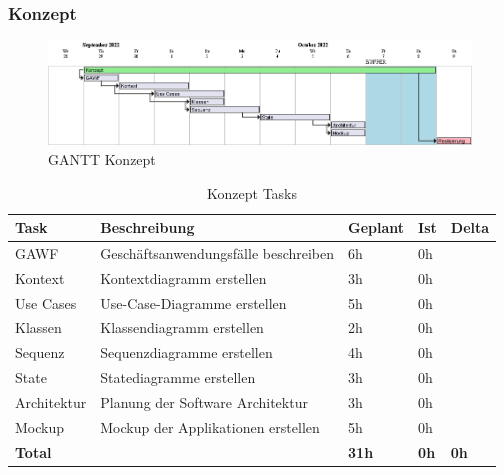   
  \subsubsection{Konzept}
  \begin{figure}[H]
    \begin{center}
      \includegraphics[width=1\linewidth]{../content/diagrams/gantt/conceptPlanning/roughtPlanning.png}
      \caption{GANTT Konzept }
    \end{center}
  \end{figure}
  \begin{table}[H]
    \centering
    \settowidth{}
    \setlength\extrarowheight{2pt}
    \begin{tabulary}{1.0\textwidth}{|L|L|L|L|L|}
      \hline
      \textbf{Task} &
      \textbf{Beschreibung} &
      \textbf{Geplant}&
      \textbf{Ist}&
      \textbf{Delta}\\
      \hline
      GAWF &
      Geschäftsanwendungsfälle beschreiben &
      6h &
      0h &
      \\
      \hline
      Kontext &
      Kontextdiagramm erstellen &
      3h &
      0h &
      \\
      \hline
      Use Cases &
      Use-Case-Diagramme erstellen&
      5h &
      0h &
      \\
      \hline
      Klassen &
      Klassendiagramm erstellen &
      2h &
      0h &
      \\
      \hline
      Sequenz &
      Sequenzdiagramme erstellen &
      4h &
      0h &
      \\
      \hline
      State &
      Statediagramme erstellen &
      3h &
      0h &
      \\
      \hline
      Architektur &
      Planung der Software Architektur &
      3h &
      0h &
      \\
      \hline
      Mockup&
      Mockup der Applikationen erstellen &
      5h &
      0h &
      \\
      \hline
      \textbf{Total} &
       &
      \textbf{31h} &
      \textbf{0h}&
      \textbf{0h} \\
      \hline
    \end{tabulary}
    \caption{Konzept Tasks}
  \end{table}

